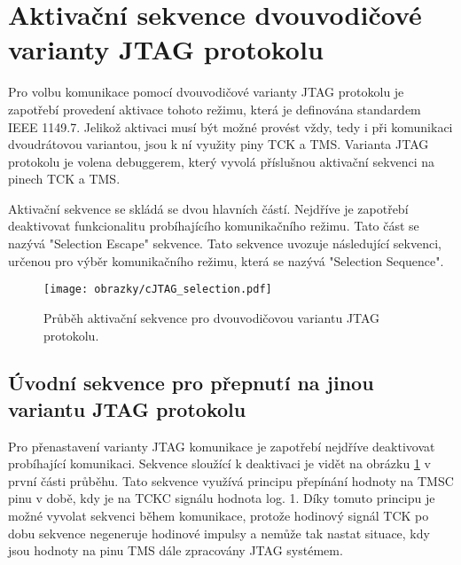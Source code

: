 
\section{Aktivační sekvence dvouvodičové varianty JTAG protokolu}
Pro volbu komunikace pomocí dvouvodičové varianty \acs{JTAG} protokolu je zapotřebí provedení aktivace tohoto režimu, která je definována standardem IEEE 1149.7. Jelikož aktivaci musí být možné provést vždy, tedy i při komunikaci dvoudrátovou variantou, jsou k ní využity piny \acs{TCK} a \acs{TMS}. Varianta \acs{JTAG} protokolu je volena debuggerem, který vyvolá příslušnou aktivační sekvenci na pinech \acs{TCK} a \acs{TMS}. \cite{IEEE_1149-7}

Aktivační sekvence se skládá se dvou hlavních částí. Nejdříve je zapotřebí deaktivovat funkcionalitu probíhajícího komunikačního režimu. Tato část se nazývá "Selection Escape" sekvence. Tato sekvence uvozuje následující sekvenci, určenou pro výběr komunikačního režimu, která se nazývá "Selection Sequence". \cite{IEEE_1149-7}

\begin{figure}[!h]
  \begin{center}
    \texttt{[image: obrazky/cJTAG\_selection.pdf]}
  \end{center}
  \caption{Průběh aktivační sekvence pro dvouvodičovou variantu \acs{JTAG} protokolu.}
	\label{fig:cJTAG_sel}
\end{figure}

\subsection{Úvodní sekvence pro přepnutí na jinou variantu JTAG protokolu}	\label{subsec:sel_escape}
Pro přenastavení varianty \acs{JTAG} komunikace je zapotřebí nejdříve deaktivovat probíhající komunikaci. Sekvence sloužící k deaktivaci je vidět na obrázku \ref{fig:cJTAG_sel} v první části průběhu. Tato sekvence využívá principu přepínání hodnoty na TMSC pinu v době, kdy je na TCKC signálu hodnota log. 1. Díky tomuto principu je možné vyvolat sekvenci během komunikace, protože hodinový signál \acs{TCK} po dobu sekvence negeneruje hodinové impulsy a nemůže tak nastat situace, kdy jsou hodnoty na pinu \acs{TMS} dále zpracovány \acs{JTAG} systémem. \cite{IEEE_1149-7}

